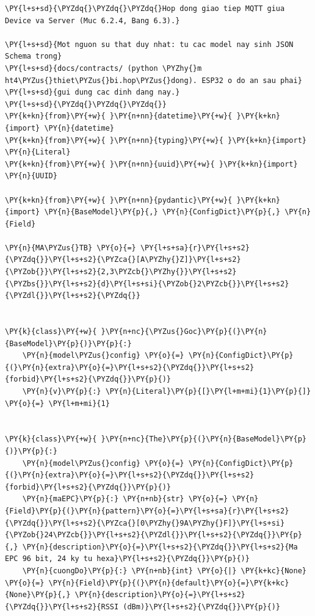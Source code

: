 \begin{Verbatim}[commandchars=\\\{\},frame=single,framerule=0.3pt,rulecolor=\color{black!40},fontsize=\footnotesize,breaklines=true]
\PY{l+s+sd}{\PYZdq{}\PYZdq{}\PYZdq{}Hop dong giao tiep MQTT giua Device va Server (Muc 6.2.4, Bang 6.3).}

\PY{l+s+sd}{Mot nguon su that duy nhat: tu cac model nay sinh JSON Schema trong}
\PY{l+s+sd}{docs/contracts/ (python \PYZhy{}m ht4\PYZus{}thiet\PYZus{}bi.hop\PYZus{}dong). ESP32 o do an sau phai}
\PY{l+s+sd}{gui dung cac dinh dang nay.}
\PY{l+s+sd}{\PYZdq{}\PYZdq{}\PYZdq{}}
\PY{k+kn}{from}\PY{+w}{ }\PY{n+nn}{datetime}\PY{+w}{ }\PY{k+kn}{import} \PY{n}{datetime}
\PY{k+kn}{from}\PY{+w}{ }\PY{n+nn}{typing}\PY{+w}{ }\PY{k+kn}{import} \PY{n}{Literal}
\PY{k+kn}{from}\PY{+w}{ }\PY{n+nn}{uuid}\PY{+w}{ }\PY{k+kn}{import} \PY{n}{UUID}

\PY{k+kn}{from}\PY{+w}{ }\PY{n+nn}{pydantic}\PY{+w}{ }\PY{k+kn}{import} \PY{n}{BaseModel}\PY{p}{,} \PY{n}{ConfigDict}\PY{p}{,} \PY{n}{Field}

\PY{n}{MA\PYZus{}TB} \PY{o}{=} \PY{l+s+sa}{r}\PY{l+s+s2}{\PYZdq{}}\PY{l+s+s2}{\PYZca{}[A\PYZhy{}Z]}\PY{l+s+s2}{\PYZob{}}\PY{l+s+s2}{2,3\PYZcb{}\PYZhy{}}\PY{l+s+s2}{\PYZbs{}}\PY{l+s+s2}{d}\PY{l+s+si}{\PYZob{}2\PYZcb{}}\PY{l+s+s2}{\PYZdl{}}\PY{l+s+s2}{\PYZdq{}}


\PY{k}{class}\PY{+w}{ }\PY{n+nc}{\PYZus{}Goc}\PY{p}{(}\PY{n}{BaseModel}\PY{p}{)}\PY{p}{:}
    \PY{n}{model\PYZus{}config} \PY{o}{=} \PY{n}{ConfigDict}\PY{p}{(}\PY{n}{extra}\PY{o}{=}\PY{l+s+s2}{\PYZdq{}}\PY{l+s+s2}{forbid}\PY{l+s+s2}{\PYZdq{}}\PY{p}{)}
    \PY{n}{v}\PY{p}{:} \PY{n}{Literal}\PY{p}{[}\PY{l+m+mi}{1}\PY{p}{]} \PY{o}{=} \PY{l+m+mi}{1}


\PY{k}{class}\PY{+w}{ }\PY{n+nc}{The}\PY{p}{(}\PY{n}{BaseModel}\PY{p}{)}\PY{p}{:}
    \PY{n}{model\PYZus{}config} \PY{o}{=} \PY{n}{ConfigDict}\PY{p}{(}\PY{n}{extra}\PY{o}{=}\PY{l+s+s2}{\PYZdq{}}\PY{l+s+s2}{forbid}\PY{l+s+s2}{\PYZdq{}}\PY{p}{)}
    \PY{n}{maEPC}\PY{p}{:} \PY{n+nb}{str} \PY{o}{=} \PY{n}{Field}\PY{p}{(}\PY{n}{pattern}\PY{o}{=}\PY{l+s+sa}{r}\PY{l+s+s2}{\PYZdq{}}\PY{l+s+s2}{\PYZca{}[0\PYZhy{}9A\PYZhy{}F]}\PY{l+s+si}{\PYZob{}24\PYZcb{}}\PY{l+s+s2}{\PYZdl{}}\PY{l+s+s2}{\PYZdq{}}\PY{p}{,} \PY{n}{description}\PY{o}{=}\PY{l+s+s2}{\PYZdq{}}\PY{l+s+s2}{Ma EPC 96 bit, 24 ky tu hexa}\PY{l+s+s2}{\PYZdq{}}\PY{p}{)}
    \PY{n}{cuongDo}\PY{p}{:} \PY{n+nb}{int} \PY{o}{|} \PY{k+kc}{None} \PY{o}{=} \PY{n}{Field}\PY{p}{(}\PY{n}{default}\PY{o}{=}\PY{k+kc}{None}\PY{p}{,} \PY{n}{description}\PY{o}{=}\PY{l+s+s2}{\PYZdq{}}\PY{l+s+s2}{RSSI (dBm)}\PY{l+s+s2}{\PYZdq{}}\PY{p}{)}



\end{Verbatim}
